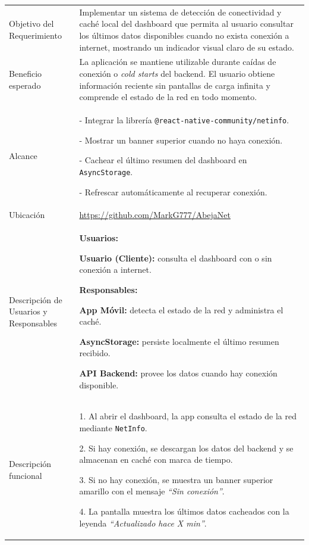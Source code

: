 \noindent
\begin{tabular}{|p{4.5cm}|p{11cm}|}
\hline
\rowcolor{secVerde}\multicolumn{2}{|l|}{\color{white}\textbf{3. DESCRIPCIÓN DEL REQUERIMIENTO}} \\
\hline
Objetivo del Requerimiento &
Implementar un sistema de detección de conectividad y caché local del dashboard que permita al usuario consultar los últimos datos disponibles cuando no exista conexión a internet, mostrando un indicador visual claro de su estado. \\
\hline
Beneficio esperado &
La aplicación se mantiene utilizable durante caídas de conexión o \textit{cold starts} del backend. El usuario obtiene información reciente sin pantallas de carga infinita y comprende el estado de la red en todo momento. \\
\hline
Alcance &
- Integrar la librería \texttt{@react-native-community/netinfo}. \par
- Mostrar un banner superior cuando no haya conexión. \par
- Cachear el último resumen del dashboard en \texttt{AsyncStorage}. \par
- Refrescar automáticamente al recuperar conexión. \\
\hline
Ubicación & \url{https://github.com/MarkG777/AbejaNet} \\ \hline
Descripción de Usuarios y Responsables &
\textbf{Usuarios:} \par
\textbf{Usuario (Cliente):} consulta el dashboard con o sin conexión a internet. \par
\vspace{0.1cm}
\textbf{Responsables:} \par
\textbf{App Móvil:} detecta el estado de la red y administra el caché. \par
\textbf{AsyncStorage:} persiste localmente el último resumen recibido. \par
\textbf{API Backend:} provee los datos cuando hay conexión disponible. \\
\hline
Descripción funcional &
1. Al abrir el dashboard, la app consulta el estado de la red mediante \texttt{NetInfo}. \par
2. Si hay conexión, se descargan los datos del backend y se almacenan en caché con marca de tiempo. \par
3. Si no hay conexión, se muestra un banner superior amarillo con el mensaje \textit{``Sin conexión''}. \par
4. La pantalla muestra los últimos datos cacheados con la leyenda \textit{``Actualizado hace X min''}. \par

\end{tabular}
